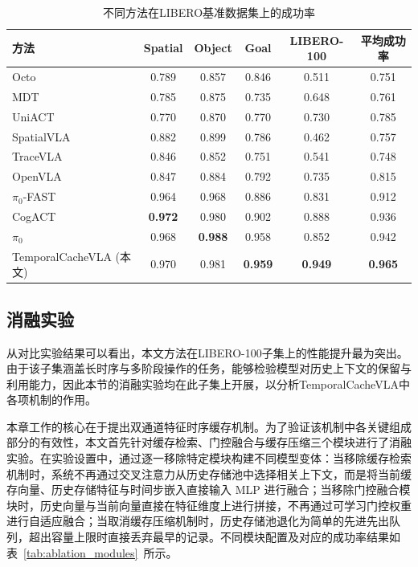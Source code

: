 \begin{table}[H]
  \centering
  \caption{不同方法在LIBERO基准数据集上的成功率}
  \label{tab:libero_results}
  \begin{tabular}{lccccc}
    \toprule
    方法 & Spatial & Object & Goal & LIBERO-100 & 平均成功率 \\
    \midrule
    Octo\cite{mees2024octo} & 0.789 & 0.857 & 0.846 & 0.511  & 0.751 \\
    MDT\cite{reuss2024multimodal} & 0.785 & 0.875 & 0.735 & 0.648 & 0.761 \\
    UniACT\cite{zheng2025uniact} & 0.770 & 0.870 & 0.770  & 0.730 & 0.785 \\
    SpatialVLA\cite{qu2025spatialvla} & 0.882 & 0.899 & 0.786  & 0.462 & 0.757 \\
    TraceVLA\cite{zheng2024tracevla} & 0.846 & 0.852 & 0.751 & 0.541 & 0.748 \\
    OpenVLA\cite{kim2024openvla} & 0.847 & 0.884 & 0.792 & 0.735 & 0.815 \\
    $\pi_0$-FAST\cite{pertsch2025fast} & 0.964 & 0.968 & 0.886 & 0.831 & 0.912 \\
    CogACT\cite{liang2024cogact} & \textbf{0.972} & 0.980 & 0.902 & 0.888 & 0.936 \\
    $\pi_0$\cite{black2024pi} & 0.968 & \textbf{0.988} & 0.958 & 0.852 & 0.942 \\
    \midrule
    TemporalCacheVLA (本文) & 0.970 & 0.981 & \textbf{0.959} & \textbf{0.949} & \textbf{0.965} \\
    \bottomrule
  \end{tabular}
\end{table}

\subsection{消融实验}
\label{subsec:chap4_ablation}

从对比实验结果可以看出，本文方法在LIBERO-100子集上的性能提升最为突出。由于该子集涵盖长时序与多阶段操作的任务，能够检验模型对历史上下文的保留与利用能力，因此本节的消融实验均在此子集上开展，以分析TemporalCacheVLA中各项机制的作用。

本章工作的核心在于提出双通道特征时序缓存机制。为了验证该机制中各关键组成部分的有效性，本文首先针对缓存检索、门控融合与缓存压缩三个模块进行了消融实验。在实验设置中，通过逐一移除特定模块构建不同模型变体：当移除缓存检索机制时，系统不再通过交叉注意力从历史存储池中选择相关上下文，而是将当前缓存向量、历史存储特征与时间步嵌入直接输入 MLP 进行融合；当移除门控融合模块时，历史向量与当前向量直接在特征维度上进行拼接，不再通过可学习门控权重进行自适应融合；当取消缓存压缩机制时，历史存储池退化为简单的先进先出队列，超出容量上限时直接丢弃最早的记录。不同模块配置及对应的成功率结果如表~\ref{tab:ablation_modules}~所示。

